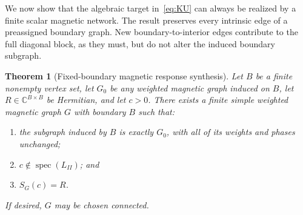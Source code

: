 \documentclass[11pt]{article}
\numberwithin{equation}{section}
\newtheorem{theorem}{Theorem}[section]
\theoremstyle{definition}
\theoremstyle{remark}
\newcommand{\C}{\mathbb{C}}
\newcommand{\spec}{\operatorname{spec}}
\begin{document}
We now show that the algebraic target in~\cref{eq:KU} can always be realized by
a finite scalar magnetic network.  The result preserves every intrinsic edge
of a preassigned boundary graph.  New boundary-to-interior edges contribute to
the full diagonal block, as they must, but do not alter the induced boundary
subgraph.

\begin{theorem}[Fixed-boundary magnetic response synthesis]
\label{thm:response-synthesis}
Let $B$ be a finite nonempty vertex set, let $G_0$ be any weighted magnetic
graph induced on $B$, let $R\in\C^{B\times B}$ be Hermitian, and let $c>0$.
There exists a finite simple weighted magnetic graph $G$ with boundary $B$ such
that:
\begin{enumerate}[label=(\roman*)]
  \item the subgraph induced by $B$ is exactly $G_0$, with all of its weights
  and phases unchanged;
  \item $c\notin\spec(L_{II})$; and
  \item $S_G(c)=R$.
\end{enumerate}
If desired, $G$ may be chosen connected.
\end{theorem}
\end{document}
